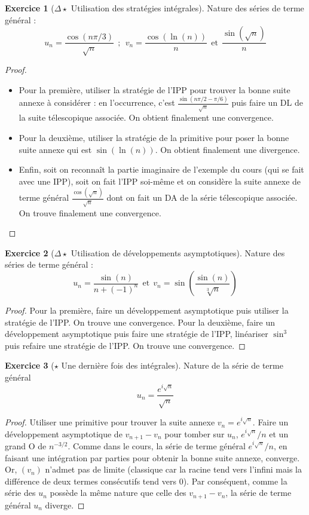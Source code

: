 \documentclass[french]{book}
\theoremstyle{definition}
\newtheorem{ex}{Exercice}[chapter]
\theoremstyle{theorem}
\theoremstyle{remark}
\begin{document}
\begin{ex}[$\Delta\star$ Utilisation des stratégies intégrales]
	Nature des séries de terme général :
	$$u_n=\frac{\cos(n\pi/3)}{\sqrt{n}}\ \ ; \ \ v_n=\frac{\cos(\ln(n))}{n}\ \ \text{et} \ \ \frac{\sin(\sqrt{n})}{n}$$
\end{ex}

\begin{proof}
	\begin{itemize}
		\item Pour la première, utiliser la stratégie de l'IPP pour trouver la bonne suite annexe à considérer : en l'occurrence, c'est $\displaystyle\frac{\sin(n\pi/2-\pi/6)}{\sqrt{n}}$ puis faire un DL de la suite télescopique associée. On obtient finalement une convergence.
		\item Pour la deuxième, utiliser la stratégie de la primitive pour poser la bonne suite annexe qui est $\sin(\ln(n))$. On obtient finalement une divergence.
		\item Enfin, soit on reconnaît la partie imaginaire de l'exemple du cours (qui se fait avec une IPP), soit on fait l'IPP soi-même et on considère la suite annexe de terme général $\displaystyle\frac{\cos(\sqrt{n})}{\sqrt{n}}$ dont on fait un DA de la série télescopique associée. On trouve finalement une convergence.
	\end{itemize}
\end{proof}

\begin{ex}[$\Delta\star$ Utilisation de développements asymptotiques]
	Nature des séries de terme général : 
	$$u_n=\frac{\sin(n)}{n+(-1)^n}\ \ \text{et} \ \ v_n=\sin\left(\frac{\sin(n)}{\sqrt[3]{n}}\right)$$
\end{ex}

\begin{proof}
	Pour la première, faire un développement asymptotique puis utiliser la stratégie de l'IPP. On trouve une convergence. Pour la deuxième, faire un développement asymptotique puis faire une stratégie de l'IPP, linéariser $\sin^3$ puis refaire une stratégie de l'IPP. On trouve une convergence.
\end{proof}

\begin{ex}[$\star$ Une dernière fois des intégrales]
	Nature de la série de terme général $$u_n=\frac{e^{i\sqrt{n}}}{\sqrt{n}}$$
\end{ex}

\begin{proof}
	Utiliser une primitive pour trouver la suite annexe $v_n=e^{i\sqrt{n}}$. Faire un développement asymptotique de $v_{n+1}-v_n$ pour tomber sur $u_n$, $e^{i\sqrt{n}}/n$ et un grand O de $n^{-3/2}$. Comme dans le cours, la série de terme général $e^{i\sqrt{n}}/n$, en faisant une intégration par parties pour obtenir la bonne suite annexe, converge. Or, $(v_n)$ n'admet pas de limite (classique car la racine tend vers l'infini mais la différence de deux termes consécutifs tend vers 0). Par conséquent, comme la série des $u_n$ possède la même nature que celle des $v_{n+1}-v_n$, la série de terme général $u_n$ diverge.
\end{proof}
\end{document}
